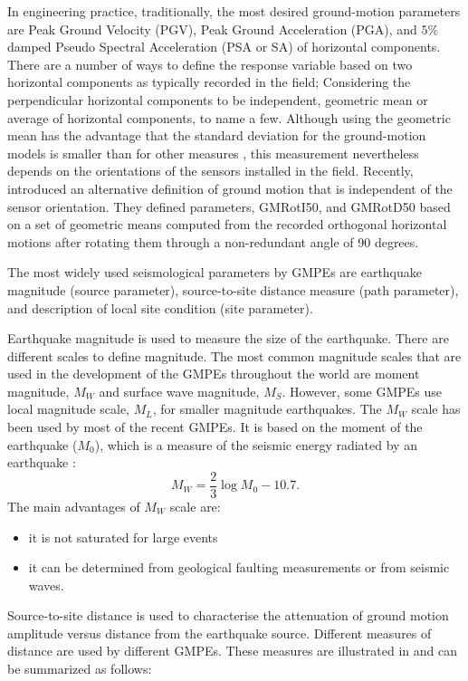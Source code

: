 In engineering practice, traditionally, the most desired
ground-motion parameters are Peak Ground Velocity (PGV), Peak Ground
Acceleration (PGA), and $5\%$ damped Pseudo Spectral Acceleration
(PSA or SA) of horizontal components. There are a number of ways to
define the response variable based on two horizontal components as
typically recorded in the field; Considering the perpendicular
horizontal components to be independent, geometric mean or average
of horizontal components, to name a few. Although using the
geometric mean has the advantage that the standard deviation for the
ground-motion models is smaller than for other measures
\citep{eqrm_Beyer06}, this measurement nevertheless depends on the
orientations of the sensors installed in the field. Recently,
\citet{eqrm_Boore06} introduced an alternative definition of ground
motion that is independent of the sensor orientation. They defined
parameters, GMRotI50, and GMRotD50 based on a set of geometric means
computed from the recorded orthogonal horizontal motions after
rotating them through a non-redundant angle of 90 degrees.

The most widely used seismological parameters by GMPEs are
earthquake magnitude (source parameter), source-to-site distance
measure (path parameter), and description of local site condition
(site parameter).

Earthquake magnitude is used to measure the size of the earthquake.
There are different scales to define magnitude. The most common
magnitude scales that are used in the development of the GMPEs
throughout the world are moment magnitude, $M_W$ and surface wave
magnitude, $M_S$. However, some GMPEs use local magnitude scale,
$M_L$, for smaller magnitude earthquakes. The $M_W$ scale has been
used by most of the recent GMPEs. It is based on the moment of the
earthquake ($M_0$), which is a measure of the seismic energy
radiated by an earthquake \citep{eqrm_Hanks79}:
\begin{equation}\label{eq:MW}
M_W=\frac{2}{3}\log {M_0}-10.7.
\end{equation}
The main advantages of $M_W$ scale are:
\begin{itemize}
\item it is not saturated for large events
\item it can be determined from geological faulting measurements
or from seismic waves.
\end{itemize}
Source-to-site distance is used to characterise the attenuation of
ground motion amplitude versus distance from the earthquake source.
Different measures of distance are used by different GMPEs. These
measures are illustrated in  and can be
summarized as follows:

